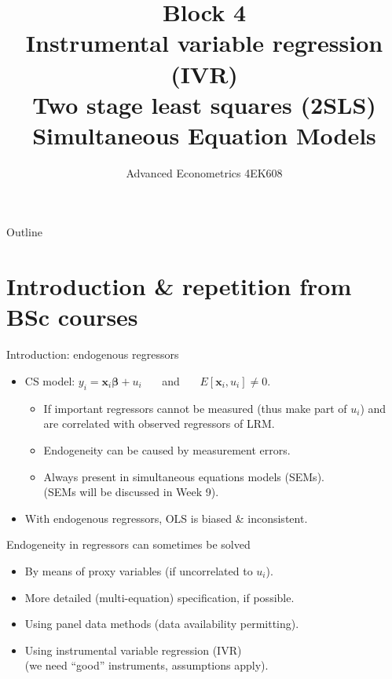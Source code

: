 \documentclass[usenames,dvipsnames]{beamer}
\title[Block 4]{Block 4\\ Instrumental variable regression (IVR)\\ Two stage least squares (2SLS)\\Simultaneous Equation Models}
\author{Advanced Econometrics 4EK608}
\institute{Vysoká škola ekonomická v Praze}
\date{}
\begin{document}
 
\begin{frame}
  \titlepage
\end{frame}

\begin{frame}{Outline}
  \tableofcontents
\end{frame}

\section{Introduction \& repetition from BSc courses}
\begin{frame}{Introduction: endogenous regressors}
\begin{itemize}
\item  CS model: $y_i= \bm{x}_i\bm{\beta}+u_i$ ~~~and~~~ $E[\bm{x}_i, u_i] \neq 0$.
\begin{itemize}
\item If important regressors cannot be measured (thus make part of $u_i$)
and are correlated with observed regressors of LRM.
\item Endogeneity can be caused by measurement errors.
\item Always present in simultaneous equations models (SEMs). \\(SEMs will be discussed in Week 9).
\end{itemize}
\item With endogenous regressors, OLS is biased \& inconsistent.
\end{itemize}
\medskip
Endogeneity in regressors can sometimes be solved
\begin{itemize}
\item By means of proxy variables (if uncorrelated to $u_i$).
\item More detailed (multi-equation) specification, if possible.
\item Using panel data methods (data availability permitting).
\item Using instrumental variable regression (IVR) \\(we need ``good'' instruments, assumptions apply).
\end{itemize}
\end{frame}
\end{document}
